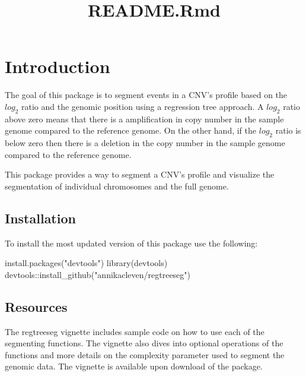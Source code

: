 \documentclass[
]{article}
\title{README.Rmd}
\author{}
\date{\vspace{-2.5em}}
\newenvironment{Shaded}{\begin{snugshade}}{\end{snugshade}}
\newcommand{\FunctionTok}[1]{\textcolor[rgb]{0.00,0.00,0.00}{#1}}
\newcommand{\NormalTok}[1]{#1}
\newcommand{\SpecialCharTok}[1]{\textcolor[rgb]{0.00,0.00,0.00}{#1}}
\newcommand{\StringTok}[1]{\textcolor[rgb]{0.31,0.60,0.02}{#1}}
\begin{document}
\maketitle

\hypertarget{introduction}{%
\section{Introduction}\label{introduction}}

The goal of this package is to segment events in a CNV's profile based
on the \(log_2\) ratio and the genomic position using a regression tree
approach. A \(log_2\) ratio above zero means that there is a
amplification in copy number in the sample genome compared to the
reference genome. On the other hand, if the \(log_2\) ratio is below
zero then there is a deletion in the copy number in the sample genome
compared to the reference genome.

This package provides a way to segment a CNV's profile and visualize the
segmentation of individual chromosomes and the full genome.

\hypertarget{installation}{%
\subsection{Installation}\label{installation}}

To install the most updated version of this package use the following:

\begin{Shaded}
\begin{Highlighting}[]
\FunctionTok{install.packages}\NormalTok{(}\StringTok{"devtools"}\NormalTok{)}
\FunctionTok{library}\NormalTok{(devtools)}
\NormalTok{devtools}\SpecialCharTok{::}\FunctionTok{install\_github}\NormalTok{(}\StringTok{"annikacleven/regtreeseg"}\NormalTok{)}
\end{Highlighting}
\end{Shaded}

\hypertarget{resources}{%
\subsection{Resources}\label{resources}}

The regtreeseg vignette includes sample code on how to use each of the
segmenting functions. The vignette also dives into optional operations
of the functions and more details on the complexity parameter used to
segment the genomic data. The vignette is available upon download of the
package.
\end{document}
